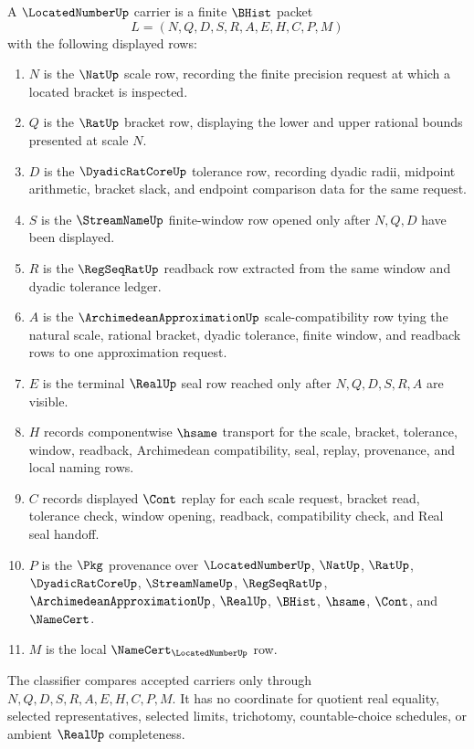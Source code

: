 \begin{definition}
\label{def:located-number-carrier}
A $\LocatedNumberUp$ carrier is a finite $\BHist$ packet
$$
L=(N,Q,D,S,R,A,E,H,C,P,M)
$$
with the following displayed rows:
\begin{enumerate}
\item $N$ is the $\NatUp$ scale row, recording the finite precision request at which a located bracket is inspected.
\item $Q$ is the $\RatUp$ bracket row, displaying the lower and upper rational bounds presented at scale $N$.
\item $D$ is the $\DyadicRatCoreUp$ tolerance row, recording dyadic radii, midpoint arithmetic, bracket slack, and endpoint comparison data for the same request.
\item $S$ is the $\StreamNameUp$ finite-window row opened only after $N,Q,D$ have been displayed.
\item $R$ is the $\RegSeqRatUp$ readback row extracted from the same window and dyadic tolerance ledger.
\item $A$ is the $\ArchimedeanApproximationUp$ scale-compatibility row tying the natural scale, rational bracket, dyadic tolerance, finite window, and readback rows to one approximation request.
\item $E$ is the terminal $\RealUp$ seal row reached only after $N,Q,D,S,R,A$ are visible.
\item $H$ records componentwise $\hsame$ transport for the scale, bracket, tolerance, window, readback, Archimedean compatibility, seal, replay, provenance, and local naming rows.
\item $C$ records displayed $\Cont$ replay for each scale request, bracket read, tolerance check, window opening, readback, compatibility check, and Real seal handoff.
\item $P$ is the $\Pkg$ provenance over $\LocatedNumberUp$, $\NatUp$, $\RatUp$, $\DyadicRatCoreUp$, $\StreamNameUp$, $\RegSeqRatUp$, $\ArchimedeanApproximationUp$, $\RealUp$, $\BHist$, $\hsame$, $\Cont$, and $\NameCert$.
\item $M$ is the local $\NameCert_{\LocatedNumberUp}$ row.
\end{enumerate}
The classifier compares accepted carriers only through $N,Q,D,S,R,A,E,H,C,P,M$. It has no coordinate for quotient real equality, selected representatives, selected limits, trichotomy, countable-choice schedules, or ambient $\RealUp$ completeness.
\end{definition}

